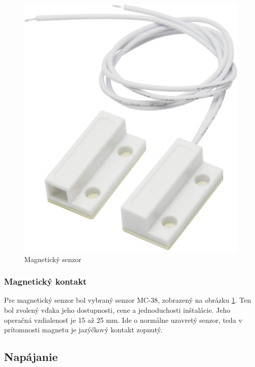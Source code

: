 \begin{figure}[!ht]
    \centering
    \includegraphics[scale=0.1]{obrazky-figures/magneticky_senzor.jpg}
    \caption[Magnetický senzor]{Magnetický senzor\footnotemark}
    \label{fig:magneticky_senzor}
\end{figure}

\subsubsection{Magnetický kontakt}

Pre magnetický senzor bol vybraný senzor MC-38, zobrazený na obrázku \ref{fig:magneticky_senzor}. Ten bol zvolený vďaka jeho dostupnosti, cene a jednoduchosti inštalácie. Jeho operačná vzdialenosť je 15 až 25 mm. Ide o normálne uzavretý senzor, teda v prítomnosti magnetu je jazýčkový kontakt zopnutý.


\subsection{Napájanie}

